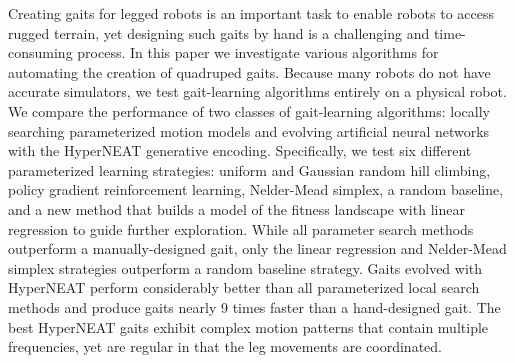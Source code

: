 Creating gaits for legged robots is an important task to enable robots
to access rugged terrain, yet designing such gaits by hand is a
challenging and time-consuming process. In this paper we investigate
various algorithms for automating the creation of quadruped
gaits. Because many robots do not have accurate simulators, we test
gait-learning algorithms entirely on a physical robot.  We compare the
performance of two classes of gait-learning algorithms: locally searching
parameterized motion models and evolving artificial neural networks
with the HyperNEAT generative encoding. Specifically, we test six
different parameterized learning strategies: uniform and Gaussian
random hill climbing, policy gradient reinforcement learning,
Nelder-Mead simplex, a random baseline, and a new method that builds a
model of the fitness landscape with linear regression to guide further
exploration.  While all parameter search methods outperform a
manually-designed gait, only the linear regression and Nelder-Mead
simplex strategies outperform a random baseline strategy. Gaits
evolved with HyperNEAT perform considerably better than all
parameterized local search methods and produce gaits nearly 9 times faster than a hand-designed gait.  The best HyperNEAT gaits exhibit
complex motion patterns that contain multiple frequencies, yet are
regular in that the leg movements are coordinated.


